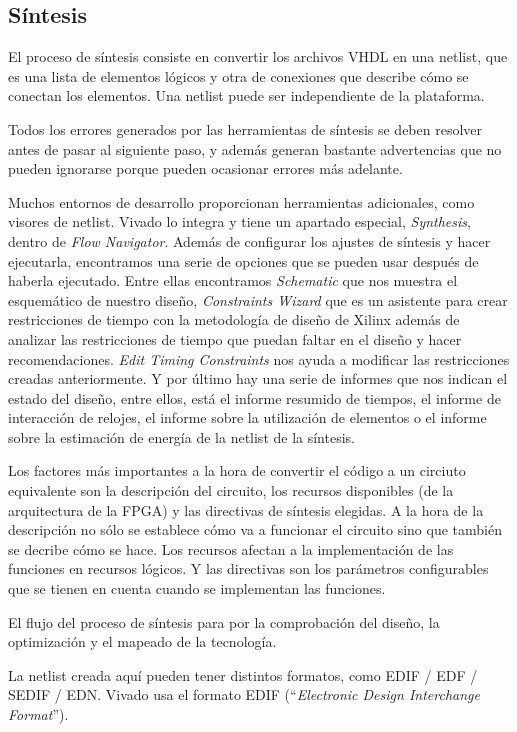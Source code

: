 \subsection{Síntesis}

El proceso de síntesis consiste en convertir los archivos VHDL en una netlist, que es una lista de elementos 
lógicos y otra de conexiones que describe cómo se conectan los elementos. Una netlist puede ser independiente 
de la plataforma. 

Todos los errores generados por las herramientas de síntesis se deben resolver antes de pasar al siguiente 
paso, y además generan bastante advertencias que no pueden ignorarse porque pueden ocasionar errores más adelante.

Muchos entornos de desarrollo proporcionan herramientas adicionales, como visores de netlist. Vivado lo integra y 
tiene un apartado especial, \textit{Synthesis}, dentro de \textit{Flow Navigator}. Además de 
configurar los ajustes de síntesis y hacer ejecutarla, encontramos una serie de opciones que se pueden usar 
después de haberla ejecutado. Entre ellas encontramos \textit{Schematic} que nos muestra el esquemático de nuestro 
diseño, \textit{Constraints Wizard} que es un asistente para crear restricciones de tiempo con la metodología 
de diseño de Xilinx además de analizar las restricciones de tiempo que puedan faltar en el diseño y hacer recomendaciones. 
\textit{Edit Timing Constraints} nos ayuda a modificar las restricciones creadas anteriormente. Y por último 
hay una serie de informes que nos indican el estado del diseño, entre ellos, está el informe resumido de tiempos, 
el informe de interacción de relojes, el informe sobre la utilización de elementos o el informe sobre la estimación 
de energía de la netlist de la síntesis. 

Los factores más importantes a la hora de convertir el código a un circiuto equivalente son la descripción 
del circuito, los recursos disponibles (de la arquitectura de la FPGA) y las directivas de síntesis elegidas. A la hora de la descripción 
no sólo se establece cómo va a funcionar el circuito sino que también se decribe cómo se hace. Los recursos 
afectan a la implementación de las funciones en recursos lógicos. Y las directivas son los 
parámetros configurables que se tienen en cuenta cuando se implementan las funciones.

El flujo del proceso de síntesis para por la comprobación del diseño, la optimización y el mapeado de la tecnología.

La netlist creada aquí pueden tener distintos formatos, como EDIF / EDF / SEDIF / EDN. Vivado usa el formato 
EDIF (``\textit{Electronic Design Interchange Format}'').

